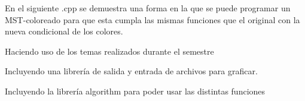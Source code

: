 En el siguiente .cpp se demuestra una forma en la que se puede programar un M\+S\+T-\/coloreado para que esta cumpla las mismas funciones que el original con la nueva condicional de los colores.


\begin{DoxyItemize}
\item Haciendo uso de los temas realizados durante el semestre
\item Incluyendo una librería de salida y entrada de archivos para graficar.
\item Incluyendo la librería algorithm para poder usar las distintas funciones 
\end{DoxyItemize}
